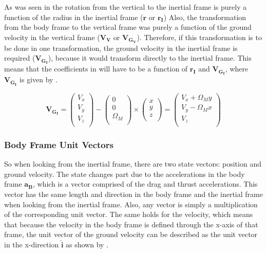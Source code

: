 
\noindent
As was seen in  the rotation from the vertical to the inertial frame is purely a function of the radius in the inertial frame ($\mathbf{r}$ or $\mathbf{r_{I}}$) Also, the transformation from the body frame to the vertical frame was purely a function of the ground velocity in the vertical frame ($\mathbf{V_{V}}$ or $\mathbf{V_{G_{V}}}$). Therefore, if this transformation is to be done in one transformation, the ground velocity in the inertial frame is required ($\mathbf{V_{G_{I}}}$), because it would transform directly to the inertial frame. This means that the coefficients in  will have to be a function of $\mathbf{r_{I}}$ and $\mathbf{V_{G_{I}}}$, where $\mathbf{V_{G_{I}}}$ is given by .

\begin{equation} \label{eq:VGI}
\mathbf{V_{G_{I}}} = 
\begin{pmatrix}
V_{x}\\
V_{y}\\
V_{z}\\
\end{pmatrix}
-
\begin{pmatrix}
0 \\
0 \\
\Omega_{M} \\
\end{pmatrix}
\times
\begin{pmatrix}
x \\
y \\
z \\
\end{pmatrix}=
\begin{pmatrix}
V_{x}+\Omega_{M}y \\
V_{y}-\Omega_{M}x \\
V_{z} \\
\end{pmatrix}
\end{equation}

\subsubsection{Body Frame Unit Vectors}
So when looking from the inertial frame, there are two state vectors: position and ground velocity. The state changes part due to the accelerations in the body frame $\mathbf{a_{B}}$, which is a vector comprised of the drag and thrust accelerations. This vector has the same length and direction in the body frame and the inertial frame when looking from the inertial frame. Also, any vector is simply a multiplication of the corresponding unit vector. The same holds for the velocity, which means that because the velocity in the body frame is defined through the x-axis of that frame, the unit vector of the ground velocity can be described as the unit vector in the x-direction $\mathbf{\hat{i}}$ as shown by .


